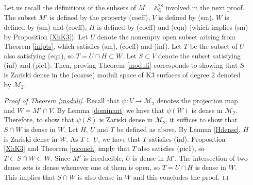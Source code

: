 \documentclass[11pt]{amsart}
\newcommand{\QQ}{\mathbb{Q}}
\theoremstyle{plain}
\theoremstyle{remark}
\begin{document}
Let us recall the definitions of the subsets of $M= \mathbb{A}_\QQ^{28}$ involved in the next proof. The subset $M'$ is defined by the property (coeff), $V$ is defined by (sm), $W$ is defined by (sm) and (coeff), $H$ is defined by (coeff) and (eqn) (which implies (sm) by Proposition \ref{XhK3}). Let $U$ denote the nonempty open subset arising from Theorem \ref{infpts}, which satisfies (sm), (coeff) and (inf). Let $T$ be the subset of $U$ also satisfying (eqn), so $T=U\cap H\subset W$. 
Let $S\subset V$ denote the subset satisfying (inf) and (pic1). Then, proving Theorem \ref{moduli} corresponds to showing that $S$ is Zariski dense in the (coarse) moduli space of K3 surfaces of degree 2 denoted by $\mathcal{M}_2$. 
\begin{proof}[Proof of Theorem \ref{moduli}]
Recall that
$ \psi\colon V \rightarrow \mathcal{M}_2$ denotes
the projection map and $W=M'\cap V$.
By Lemma \ref{dominant} we have that $\psi(W)$ is dense in $\mathcal{M}_2$.
Therefore, to show that $\psi(S)$ is Zariski dense in $\mathcal{M}_2$, it suffices to show that $S\cap W$ is dense in $W$. Let $H$, $U$ and $T$ be defined as above. By Lemma \ref{Hdense}, $H$ is Zariski dense in $W$.
As $T\subset U$, we have that $T$ satisfies (inf). Proposition \ref{XhK3} and Theorem \ref{piconeh} imply that $T$ also satisfies (pic1), so $T\subset S\cap W\subset W$. Since $M'$ is irreducible, $U$ is dense in $M'$. The intersection of two dense sets is dense whenever one of them is open, so $T=U\cap H$ is dense in $W$. This implies that $S\cap W$ is also dense in $W$ and this concludes the proof.
\end{proof}
\end{document}
